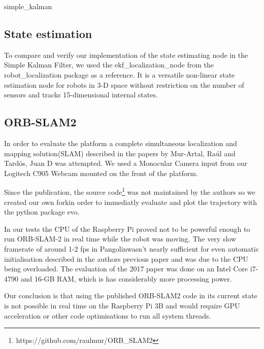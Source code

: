 \documentclass[class=article, crop=false]{standalone}
\begin{document}
{simple_kalman}

\subsection{State estimation}\label{subsec:state-est}
To compare and verify our implementation of the state estimating node in the Simple Kalman Filter, we used the ekf\_localization\_node from the  robot\_localization\cite{MooreStouchKeneralizedEkf2014} package as a reference.
It is a versatile non-linear state estimation node for robots in 3-D space without restriction on the number of sensors and tracks 15-dimensional internal states.
\subsection{ORB-SLAM2}\label{subsec:orbslam2}
In order to evaluate the platform a complete simultaneous localization and mapping solution(SLAM) described in the papers\cite{mur2017orb}\cite{mur2015orb} by Mur-Artal, Ra\'ul and Tard{\'o}s, Juan D was attempted. We used a Monocular Camera input from our Logitech C905 Webcam mounted on the front of the platform.

Since the publication, the source code\footnote{https://github.com/raulmur/ORB\_SLAM2} was not maintained by the authors so we created our own fork\footnotemark in order to immediatly evaluate and plot the trajectory with the python package evo\cite{grupp2017evo}.


In our tests the CPU of the Raspberry Pi proved not to be powerful enough to run ORB-SLAM-2 in real time while the robot was moving. The very slow framerate of around 1-2 fps in Pangolin\footnotemark wasn't nearly sufficient for even automatic initialisation described in the authors previous paper\cite{mur2015orb} and was due to the CPU being overloaded. The evaluation of the 2017 paper\cite{mur2017orb} was done on an Intel Core i7-4790 and 16-GB RAM, which is has considerably more processing power.


Our conclusion is that using the published ORB-SLAM2 code in its current state is not possible in real time on the Raspberry Pi 3B and would require GPU acceleration or other code optimisations to run all system threads.
\end{document}
